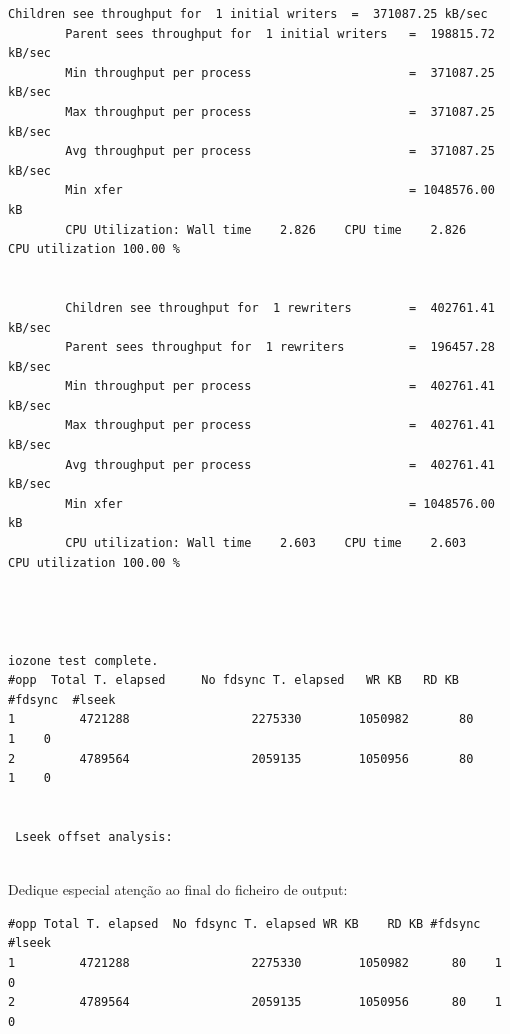 \documentclass[a4paper]{article}
\begin{document}
{\begin{lstlisting}[style=output]
        Children see throughput for  1 initial writers  =  371087.25 kB/sec
        Parent sees throughput for  1 initial writers   =  198815.72 kB/sec
        Min throughput per process                      =  371087.25 kB/sec 
        Max throughput per process                      =  371087.25 kB/sec
        Avg throughput per process                      =  371087.25 kB/sec
        Min xfer                                        = 1048576.00 kB
        CPU Utilization: Wall time    2.826    CPU time    2.826    CPU utilization 100.00 %


        Children see throughput for  1 rewriters        =  402761.41 kB/sec
        Parent sees throughput for  1 rewriters         =  196457.28 kB/sec
        Min throughput per process                      =  402761.41 kB/sec 
        Max throughput per process                      =  402761.41 kB/sec
        Avg throughput per process                      =  402761.41 kB/sec
        Min xfer                                        = 1048576.00 kB
        CPU utilization: Wall time    2.603    CPU time    2.603    CPU utilization 100.00 %




iozone test complete.
#opp  Total T. elapsed     No fdsync T. elapsed   WR KB   RD KB       #fdsync  #lseek
1         4721288                 2275330        1050982       80         1    0
2         4789564                 2059135        1050956       80         1    0


 Lseek offset analysis:


\end{lstlisting}

Dedique especial atenção ao final do ficheiro de output:

\begin{lstlisting}[style=command]
#opp Total T. elapsed  No fdsync T. elapsed WR KB    RD KB #fdsync  #lseek
1         4721288                 2275330        1050982      80    1    0
2         4789564                 2059135        1050956      80    1    0
\end{lstlisting}



}
\end{document}
